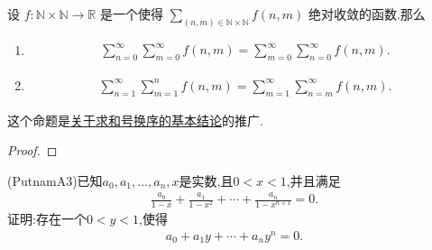 \documentclass[../../main.tex]{subfiles}
\begin{document}
\begin{theorem}\label{关于无限和的Fubinin定理}
设 \( f: \mathbb{N} \times \mathbb{N} \to \mathbb{R} \) 是一个使得 \(\sum\limits_{(n,m) \in \mathbb{N} \times \mathbb{N}} f(n,m)\) 绝对收敛的函数.那么
\begin{enumerate}[(1)]
\item \begin{align*}
\sum\limits_{n=0}^{\infty}{\sum\limits_{m=0}^{\infty}{f(n,m)}}=\sum\limits_{m=0}^{\infty}{\sum\limits_{n=0}^{\infty}{f(n,m)}.}
\end{align*}

\item \begin{align*}
\sum\limits_{n=1}^{\infty}{\sum\limits_{m=1}^n{f(n,m)}}=\sum\limits_{m=1}^{\infty}{\sum\limits_{n=m}^{\infty}{f(n,m)}}.
\end{align*}
\end{enumerate}
\end{theorem}
\begin{note}
这个命题是\hyperlink{关于求和号换序的基本结论}{关于求和号换序的基本结论}的推广.
\end{note}
\begin{proof}

\end{proof}

\begin{example}
(PutnamA3)已知\(a_0, a_1, \ldots, a_n, x\)是实数,且\(0 < x < 1\),并且满足
\begin{align*}
\frac{a_0}{1 - x}+\frac{a_1}{1 - x^2}+\cdots+\frac{a_n}{1 - x^{n + 1}} = 0.
\nonumber
\end{align*}
证明:存在一个\(0 < y < 1\),使得
\begin{align*}
a_0 + a_1y + \cdots + a_ny^n = 0.
\nonumber
\end{align*}
\end{example}
\end{document}
